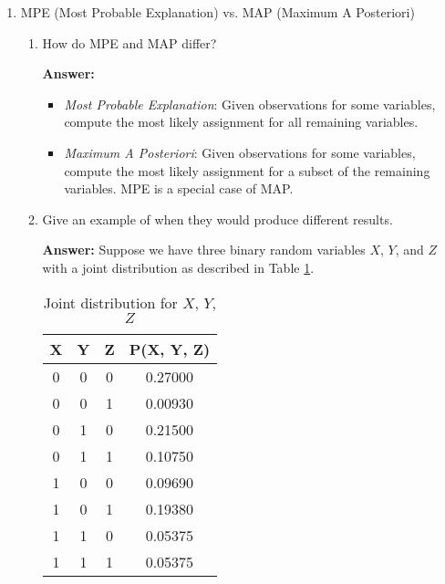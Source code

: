\documentclass{article}
\newenvironment{QandA}{\begin{enumerate}[label=\arabic*.]}{\end{enumerate}}
\newenvironment{InnerQandA}{\begin{enumerate}[label=\roman*.]}{\end{enumerate}}
\newenvironment{answer}{\par\normalfont \textbf{Answer:}}{}
\begin{document}
\begin{QandA}
\begin{answer}
        (Source: \href{https://en.wikipedia.org/wiki/Kullback%E2%80%93Leibler_divergence}{Wikipedia}, \href{https://ai.stackexchange.com/questions/18019/why-does-the-kl-divergence-not-satisfy-the-triangle-inequality}{StackExchange})
    \end{answer}

    \item MPE (Most Probable Explanation) vs. MAP (Maximum A Posteriori)
    \begin{InnerQandA}
        \item How do MPE and MAP differ?
        \begin{answer}
            \begin{itemize}
                \item \textit{Most Probable Explanation}: Given observations for some variables, compute the most likely assignment for all remaining variables. 
                \item \textit{Maximum A Posteriori}: Given observations for some variables, compute the most likely assignment for a subset of the remaining variables. MPE is a special case of MAP.
            \end{itemize}
        \end{answer}

        \item Give an example of when they would produce different results.
        \begin{answer}
            Suppose we have three binary random variables $X$, $Y$, and $Z$ with a joint distribution as described in Table \ref{tab:joint-binary-vars}.
            \begin{table}[h!]
            \centering
            \begin{tabular}{|c|c|c|c|}
            \hline
            \textbf{X} & \textbf{Y} & \textbf{Z} & \textbf{P(X, Y, Z)} \\ \hline
            0          & 0          & 0          & 0.27000             \\ \hline
            0          & 0          & 1          & 0.00930             \\ \hline
            0          & 1          & 0          & 0.21500             \\ \hline
            0          & 1          & 1          & 0.10750             \\ \hline
            1          & 0          & 0          & 0.09690             \\ \hline
            1          & 0          & 1          & 0.19380             \\ \hline
            1          & 1          & 0          & 0.05375             \\ \hline
            1          & 1          & 1          & 0.05375             \\ \hline
            \end{tabular}
            \caption{Joint distribution for $X$, $Y$, $Z$}
            \label{tab:joint-binary-vars}
            \end{table}


\end{answer}
\end{InnerQandA}
\end{QandA}
\end{document}
